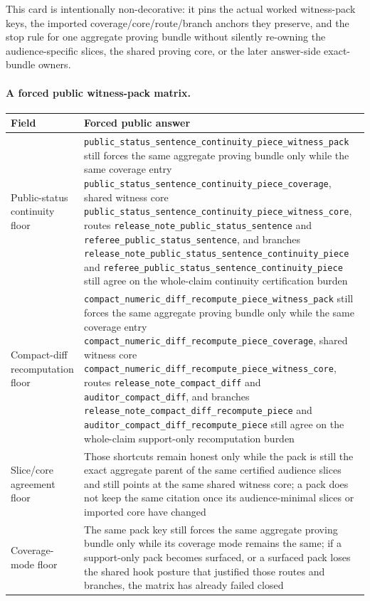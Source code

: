 \documentclass[11pt]{article}
\begin{document}
This card is intentionally non-decorative: it pins the actual worked witness-pack keys, the imported coverage/core/route/branch anchors they preserve, and the stop rule for one aggregate proving bundle without silently re-owning the audience-specific slices, the shared proving core, or the later answer-side exact-bundle owners.\cite{series:workedexample}

\paragraph{A forced public witness-pack matrix.}
\begin{table}[t]
\centering
\small
\begin{tabularx}{\linewidth}{@{}LY@{}}
\toprule
Field & Forced public answer \\
\midrule
Public-status continuity floor & \nolinkurl{public_status_sentence_continuity_piece_witness_pack} still forces the same aggregate proving bundle only while the same coverage entry \nolinkurl{public_status_sentence_continuity_piece_coverage}, shared witness core \nolinkurl{public_status_sentence_continuity_piece_witness_core}, routes \nolinkurl{release_note_public_status_sentence} and \nolinkurl{referee_public_status_sentence}, and branches \nolinkurl{release_note_public_status_sentence_continuity_piece} and \nolinkurl{referee_public_status_sentence_continuity_piece} still agree on the whole-claim continuity certification burden \\
Compact-diff recomputation floor & \nolinkurl{compact_numeric_diff_recompute_piece_witness_pack} still forces the same aggregate proving bundle only while the same coverage entry \nolinkurl{compact_numeric_diff_recompute_piece_coverage}, shared witness core \nolinkurl{compact_numeric_diff_recompute_piece_witness_core}, routes \nolinkurl{release_note_compact_diff} and \nolinkurl{auditor_compact_diff}, and branches \nolinkurl{release_note_compact_diff_recompute_piece} and \nolinkurl{auditor_compact_diff_recompute_piece} still agree on the whole-claim support-only recomputation burden \\
Slice/core agreement floor & Those shortcuts remain honest only while the pack is still the exact aggregate parent of the same certified audience slices and still points at the same shared witness core; a pack does not keep the same citation once its audience-minimal slices or imported core have changed \\
Coverage-mode floor & The same pack key still forces the same aggregate proving bundle only while its coverage mode remains the same; if a support-only pack becomes surfaced, or a surfaced pack loses the shared hook posture that justified those routes and branches, the matrix has already failed closed \\

\end{tabularx}
\end{table}
\end{document}
